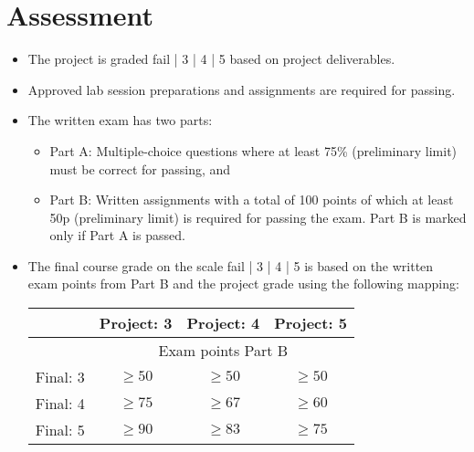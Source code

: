 \documentclass{program}
\begin{document}
\section{Assessment}
\begin{itemize}
\item The project is graded fail | 3 | 4 | 5 based on project deliverables.
\item Approved lab session preparations and assignments are required for passing.
\item The written exam has two parts: 
\begin{itemize}[nolistsep,noitemsep]
  \item Part A: Multiple-choice questions where at least 75\% (preliminary limit) must be correct for passing, and 
  \item Part B: Written assignments with a total of 100 points of which at least 50p (preliminary limit) is required for passing the exam. Part B is marked only if Part A is passed.

\end{itemize}
\item The final course grade on the scale fail | 3 | 4 | 5 is based on the written exam points from Part B and the project grade using the following mapping: 

\vspace{1em}

\begin{tabular}{r | c c c}
 & Project: 3 & Project: 4 & Project: 5 \\
\hline
 & \multicolumn{3}{c}{Exam points Part B}    \\
Final: 3 & $ \geq 50$ & $\geq 50$ & $\geq 50$ \\
Final: 4 & $ \geq 75$ & $\geq 67$ & $\geq 60$ \\
Final: 5 & $ \geq 90$ & $\geq 83$ & $\geq 75$ \\
\hline
\end{tabular}


\end{itemize}

\newpage
\end{document}
